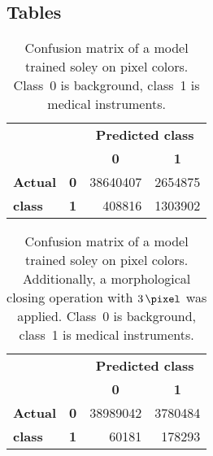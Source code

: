 
\clearpage\onecolumn
\begin{appendices}
\section{Tables}

\begin{table}[ht]
    \centering
    \begin{tabular}{llrr}
    \toprule
    ~                & ~ & \multicolumn{2}{c}{\textbf{Predicted class}}\\
    ~                & ~ & \multicolumn{1}{c}{\textbf{0}} & \multicolumn{1}{c}{\textbf{1}} \\%
    \textbf{Actual}  & \multicolumn{1}{c}{\textbf{0}} & \num{38640407}  & \num{2654875} \\
    \textbf{class}   & \multicolumn{1}{c}{\textbf{1}} &   \num{408816}  & \num{1303902} \\ \bottomrule
    \end{tabular}
    \caption{Confusion matrix of a model trained soley on pixel colors.
             Class~0 is background, class~1 is medical instruments.}
    \label{table:cm-model-301}
\end{table}

\begin{table}[ht]
    \centering
    \begin{tabular}{llrr}
    \toprule
    ~                & ~ & \multicolumn{2}{c}{\textbf{Predicted class}}\\
    ~                & ~ & \multicolumn{1}{c}{\textbf{0}} & \multicolumn{1}{c}{\textbf{1}} \\%
    \textbf{Actual}  & \multicolumn{1}{c}{\textbf{0}} & \num{38989042}  & \num{3780484} \\
    \textbf{class}   & \multicolumn{1}{c}{\textbf{1}} &    \num{60181}  &  \num{178293} \\ \bottomrule
    \end{tabular}
    \caption{Confusion matrix of a model trained soley on pixel colors. Additionally,
             a morphological closing operation with $\SI{3}{\pixel}$ was applied.
             Class~0 is background, class~1 is medical instruments.}
    \label{table:cm-model-301-closing}
\end{table}


\end{appendices}

